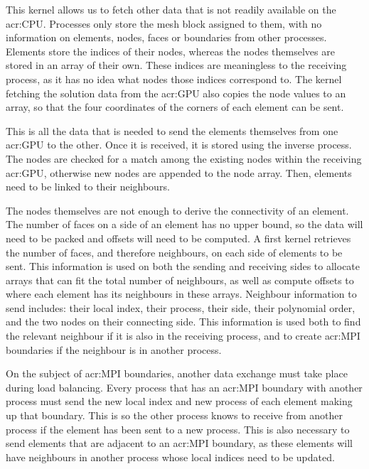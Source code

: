 This kernel allows us to fetch other data that is not readily available on the \acrshort{acr:CPU}.
Processes only store the mesh block assigned to them, with no information on elements, nodes, faces
or boundaries from other processes. Elements store the indices of their nodes, whereas the nodes
themselves are stored in an array of their own. These indices are meaningless to the receiving
process, as it has no idea what nodes those indices correspond to. The kernel fetching the solution
data from the \acrshort{acr:GPU} also copies the node values to an array, so that the four
coordinates of the corners of each element can be sent.

This is all the data that is needed to send the elements themselves from one \acrshort{acr:GPU} to
the other. Once it is received, it is stored using the inverse process. The nodes are checked for a
match among the existing nodes within the receiving \acrshort{acr:GPU}, otherwise new nodes are
appended to the node array. Then, elements need to be linked to their neighbours. 

The nodes themselves are not enough to derive the connectivity of an element. The number of faces on
a side of an element has no upper bound, so the data will need to be packed and offsets will need to
be computed. A first kernel retrieves the number of faces, and therefore neighbours, on each side of
elements to be sent. This information is used on both the sending and receiving sides to allocate
arrays that can fit the total number of neighbours, as well as compute offsets to where each element
has its neighbours in these arrays. Neighbour information to send includes: their local index, their
process, their side, their polynomial order, and the two nodes on their connecting side. This
information is used both to find the relevant neighbour if it is also in the receiving process, and
to create \acrshort{acr:MPI} boundaries if the neighbour is in another process.

On the subject of \acrshort{acr:MPI} boundaries, another data exchange must take place during load
balancing. Every process that has an \acrshort{acr:MPI} boundary with another process must send the
new local index and new process of each element making up that boundary. This is so the other
process knows to receive from another process if the element has been sent to a new process. This is
also necessary to send elements that are adjacent to an \acrshort{acr:MPI} boundary, as these
elements will have neighbours in another process whose local indices need to be updated.

